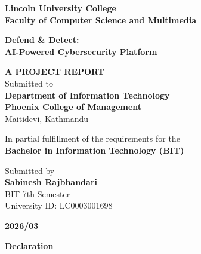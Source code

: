 \documentclass[12pt,a4paper]{report}
\begin{document}
\begin{titlepage}
    \begin{center}
        \textbf{\Large Lincoln University College}\\
        \textbf{\large Faculty of Computer Science and Multimedia}\\
        
        \vspace{1.5cm}
        
        \textbf{\LARGE Defend \& Detect:}\\
        \textbf{\LARGE AI-Powered Cybersecurity Platform}\\
        
        \vspace{1.5cm}
        
        \textbf{A PROJECT REPORT}\\
        \vspace{0.5cm}
        Submitted to\\
        \textbf{Department of Information Technology}\\
        \textbf{Phoenix College of Management}\\
        Maitidevi, Kathmandu\\
        
        \vspace{1.5cm}
        
        In partial fulfillment of the requirements for the\\
        \textbf{Bachelor in Information Technology (BIT)}\\
        
        \vspace{1.5cm}
        
        Submitted by\\
        \textbf{Sabinesh Rajbhandari}\\
        BIT 7th Semester\\
        University ID: LC0003001698\\
        
        \vfill
        
        \textbf{2026/03}
    \end{center}
\end{titlepage}

\newpage
\begin{center}
    \textbf{\LARGE Declaration}
\end{center}
\end{document}
